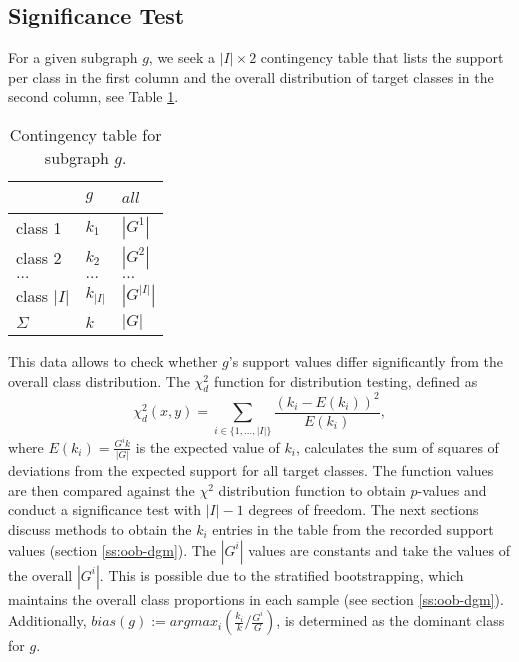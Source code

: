 \documentclass{article}
\begin{document}
\subsection{Significance Test}
\label{ss:significance-test}
For a given subgraph $g$, we seek a $|I| \times 2$ contingency table that lists the
support per class in the first column and the overall distribution of target
classes in the second column, see Table \ref{t-ContingencyTableIndTest}.
\begin{table}[t]
  \centering
  \begin{tabular}{|l|l|l|}
    \hline
    ~           &	$g$       & $all$       \\\hline
    class 1	    &	$k_1$     & $|G^1|$     \\\hline
    class 2 	  &	$k_2$     & $|G^2|$     \\\hline
    $\ldots$ 	  &	$\ldots$  & $\ldots$    \\\hline
    class $|I|$	&	$k_{|I|}$ & $|G^{|I|}|$ \\\hline
    $\Sigma$	  &	$k$       & $|G|$       \\\hline
  \end{tabular}
  \caption[]{Contingency table for subgraph $g$.}
  \label{t-ContingencyTableIndTest}
\end{table}
This data allows to check whether $g$'s support values differ
significantly from the overall class distribution.  The $\chi^2_d$ function for
distribution testing, defined as
\begin{equation}
  \chi^2_d(x,y) = \sum_{i \in \{1,\ldots,|I|\}} \frac{(k_i-E(k_i))^2}{E(k_i)},
  \label{eq:chid}
\end{equation} 
where $E(k_i)=\frac{G^{i}k}{|G|}$ is the expected value of $k_i$, calculates
the sum of squares of deviations from the expected support for all target
classes. The function values are then compared against the $\chi^2$
distribution function to obtain $p$-values and conduct a significance test with
$|I|-1$ degrees of freedom.  The next sections discuss methods to obtain the
$k_i$ entries in the table from the recorded support values (section
\ref{ss:oob-dgm}).  The $|G^{i}|$ values are constants and take the values of
the overall $|G^{i}|$.  This is possible due to the stratified bootstrapping,
which maintains the overall class proportions in each sample (see section
\ref{ss:oob-dgm}). Additionally, $bias(g) := arg max_i(\frac{k_i}{k}/\frac{G^i}{G})$, is determined as the dominant class for $g$.
\end{document}
